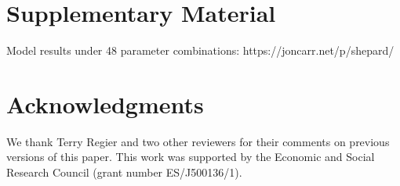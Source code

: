 \documentclass[doc,biblatex]{apa7}
\begin{document}
\section{Supplementary Material}

Model results under 48 parameter combinations: https://joncarr.net/p/shepard/

\section{Acknowledgments}

We thank Terry Regier and two other reviewers for their comments on previous versions of this paper. This work was supported by the Economic and Social Research Council (grant number ES/J500136/1).

\printbibliography
\end{document}
